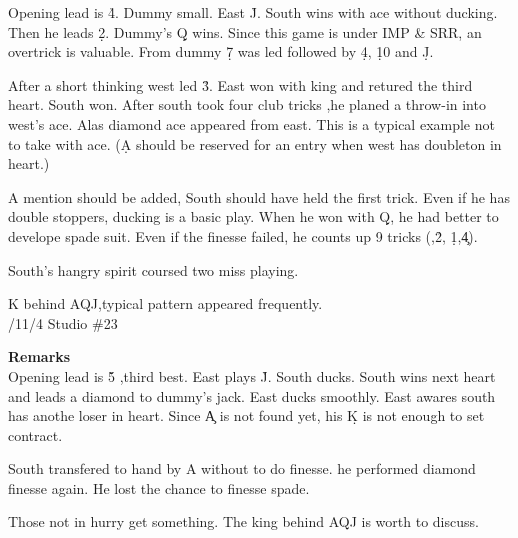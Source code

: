 Opening lead is \h 4. Dummy small. East \h J. South wins with ace
without ducking. Then he leads \d 2. Dummy's \d Q wins.
Since this game is under IMP \& SRR, an overtrick is valuable.
From dummy \d 7 was led followed by \d 4, \d 10 and \d J.

After a short thinking west led \h 3. East won with king and retured the 
third heart. South won. After south took four club tricks ,he planed
a throw-in into west's ace. Alas diamond ace appeared from east.
This is a typical example not to take with ace.
(\d A should be reserved for an entry when west has doubleton in heart.)

A mention should be added, South should have held the first trick.
Even if he has double stoppers, ducking is a basic play.
When he won with \d Q, he had better to develope spade suit.
Even if the finesse failed, he counts up 9 tricks
(,\h 2, \d 1,\c 4). 

South's hangry spirit coursed two miss playing.

\vspace {0.5cm}

K behind AQJ,typical pattern appeared frequently.\\
/11/4 Studio \#23
\begin{quote}
%
  {}%
  {}
  {}%
  {}%
\end{quote}
{\bf Remarks}\\

Opening lead is \h 5 ,third best. East plays \h J.
South ducks. South wins next heart and leads a diamond to 
dummy's jack. East ducks smoothly.
East awares south has anothe loser in heart.
Since \c A is not found yet, his \d K is not enough to set
contract.

South transfered to hand by \s A without to do finesse.
he performed diamond finesse again. He lost the chance to
finesse spade.

Those not in hurry get something. The king behind
AQJ is worth to discuss.


\vspace {0.5cm}

